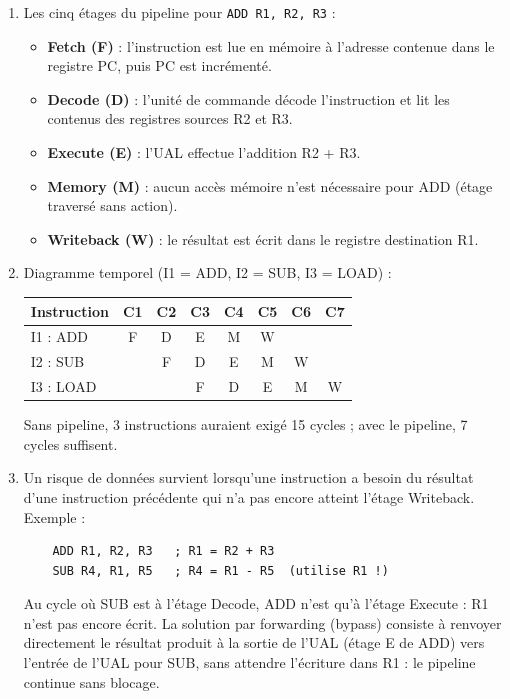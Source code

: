 \documentclass[11pt]{article}
\newcommand{\cle}[1]{{\popxbold\color{popdark}#1}}
\begin{document}
\begin{corrige}
\begin{enumerate}
    \item Les cinq étages du pipeline pour \texttt{ADD R1, R2, R3} :
    \begin{itemize}
        \item \textbf{Fetch (F)} : l'instruction est lue en mémoire à l'adresse contenue dans le registre PC, puis PC est incrémenté.
        \item \textbf{Decode (D)} : l'unité de commande décode l'instruction et lit les contenus des registres sources R2 et R3.
        \item \textbf{Execute (E)} : l'UAL effectue l'addition R2 + R3.
        \item \textbf{Memory (M)} : aucun accès mémoire n'est nécessaire pour ADD (étage traversé sans action).
        \item \textbf{Writeback (W)} : le résultat est écrit dans le registre destination R1.
    \end{itemize}
    \item Diagramme temporel (I1 = ADD, I2 = SUB, I3 = LOAD) :
    \begin{center}
    \begin{tabular}{|l|c|c|c|c|c|c|c|}
    \hline
    \rowcolor{popblueL}
    \textbf{Instruction} & \textbf{C1} & \textbf{C2} & \textbf{C3} & \textbf{C4} & \textbf{C5} & \textbf{C6} & \textbf{C7} \\ \hline
    I1 : ADD & F & D & E & M & W & & \\ \hline
    I2 : SUB & & F & D & E & M & W & \\ \hline
    I3 : LOAD & & & F & D & E & M & W \\ \hline
    \end{tabular}
    \end{center}
    Sans pipeline, 3 instructions auraient exigé 15 cycles ; avec le pipeline, 7 cycles suffisent.
    \item Un \cle{risque de données} survient lorsqu'une instruction a besoin du résultat d'une instruction précédente qui n'a pas encore atteint l'étage Writeback. Exemple :
    \begin{lstlisting}
    ADD R1, R2, R3   ; R1 = R2 + R3
    SUB R4, R1, R5   ; R4 = R1 - R5  (utilise R1 !)
    \end{lstlisting}
    Au cycle où SUB est à l'étage Decode, ADD n'est qu'à l'étage Execute : R1 n'est pas encore écrit. La solution par \cle{forwarding} (bypass) consiste à renvoyer directement le résultat produit à la sortie de l'UAL (étage E de ADD) vers l'entrée de l'UAL pour SUB, sans attendre l'écriture dans R1 : le pipeline continue sans blocage.

\end{enumerate}
\end{corrige}
\end{document}

